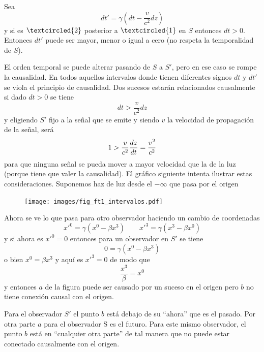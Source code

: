 \documentclass[10pt,oneside]{CBFT_book}
\begin{document}
Sea 
\[
	dt'= \gamma \left( dt - \frac{v}{c^2} dz \right)
\]
y si es $\textcircled{2}$ posterior a $\textcircled{1}$ en $S$ entonces $dt > 0 $.
Entonces $ dt'$ puede ser mayor, menor o igual a cero (no respeta la temporalidad de $S$).

El orden temporal se puede alterar pasando de $S$ a $S'$, pero en ese caso se rompe la causalidad.
En todos aquellos intervalos donde tienen diferentes signos $dt$ y $dt'$ se viola el principio de causalidad.
Dos sucesos estarán relacionados causalmente si dado $dt > 0$ se tiene 
\[
	dt > \frac{v}{c^2} dz
\]
y eligiendo $S'$ fijo a la señal que se emite y siendo $v$ la velocidad de propagación de la señal, será
\[
	1 > \frac{v}{c^2} \frac{d^{\hspace{-0.05em}} {z}}{d {t}^{\hspace{-0.05em}}} = \frac{v^2}{c^2}
\]
para que ninguna señal se pueda mover a mayor velocidad que la de la luz (porque tiene que valer la
causalidad).
El gráfico siguiente intenta ilustrar estas consideraciones.
Suponemos haz de luz desde el $-\infty$ que pasa por el origen

\begin{figure}[htb]
	\begin{center}
	\texttt{[image: images/fig\_ft1\_intervalos.pdf]}	 
	\end{center}
	\caption{}
\end{figure} 

Ahora se ve lo que pasa para otro observador haciendo un cambio de coordenadas 
\[
	x'^0 = \gamma (x^0 - \beta x^3) \qquad x'^3 = \gamma (x^3 - \beta x^0)
\]
y si ahora es $x'^0 = 0$ entonces para un observador en $S'$ se tiene 
\[
	0 = \gamma (x^0 - \beta x^3) 
\]
o bien $x^0 = \beta x^3$ y aquí es $x'^3 = 0$ de modo que 
\[
	\frac{x^3}{\beta} = x^0
\]
y entonces $a$ de la figura puede ser causado por un suceso en el origen pero $b$ no tiene 
conexión causal con el origen.

Para el observador $S'$ el punto $b$ está debajo de su ``ahora'' que es el pasado.
Por otra parte $a$ para el observador S es el futuro. Para este mismo observador, el punto
$b$ está en ``cualquier otra parte'' de tal manera que no puede estar conectado causalmente
con el origen.
\end{document}
